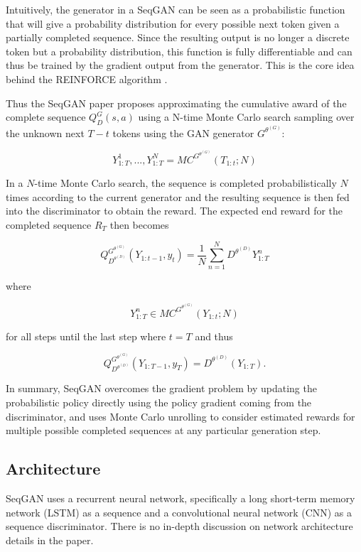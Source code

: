 \documentclass[a4paper,conference]{IEEEtran}
\begin{document}
Intuitively, the generator in a SeqGAN can be seen as a probabilistic function that will give a probability distribution for every possible next token given a partially completed sequence. Since the resulting output is no longer a discrete token but a probability distribution, this function is fully differentiable and can thus be trained by the gradient output from the generator. This is the core idea behind the REINFORCE algorithm \cite{c8}.


Thus the SeqGAN paper proposes approximating the cumulative award of the complete sequence $Q_{D}^{G}(s, a)$ using a N-time Monte Carlo search sampling over the unknown next $T - t$ tokens using the GAN generator $G^{\theta^{(G)}}$:

\begin{dmath}
{Y_{1:T}^{1}},...,Y_{1:T}^{N} = MC^{G^{\theta^{(G)}}}(T_{1:t};N)
\end{dmath}

In a $N$-time Monte Carlo search, the sequence is completed probabilistically $N$ times according to the current generator and the resulting sequence is then fed into the discriminator to obtain the reward. The expected end reward for the completed sequence $R_T$ then becomes

\begin{dmath}
Q_{D^{\theta^{(D)}}}^{G^{\theta^{(G)}}}(Y_{1:t-1}, y_t) = 
\frac{1}{N}\sum_{n=1}^{N}D^{\theta^{(D)}}Y_{1:T}^n
\end{dmath}

where 

\begin{dmath}
{Y_{1:T}^n \in MC^{G^{\theta^{(G)}}}(Y_{1:t}; N)}
\end{dmath}

for all steps until the last step where $t = T$ and thus

\begin{dmath}
Q_{D^{\theta^{(D)}}}^{G^{\theta^{(G)}}}(Y_{1:T-1}, y_T) = 
D^{\theta^{(D)}}(Y_{1:T}).
\end{dmath}

In summary, SeqGAN overcomes the gradient problem by updating the probabilistic policy directly using the policy gradient coming from the discriminator, and uses Monte Carlo unrolling to consider estimated rewards for multiple possible completed sequences at any particular generation step.

\subsection{Architecture}
SeqGAN uses a recurrent neural network, specifically a long short-term memory network (LSTM) \cite{c9} as a sequence and a convolutional neural network (CNN) \cite{c10} as a sequence discriminator. There is no in-depth discussion on network architecture details in the paper. 
\end{document}
